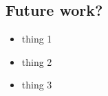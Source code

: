 \documentclass[a0,landscape]{a0poster}
\begin{document}
\begin{multicols}{3}





\section*{Future work?}
\begin{itemize}
	\item thing 1
	\item thing 2
	\item thing 3
\end{itemize}

\color{Gray}
\nocite{bader2017static,brenner2007mathematical}
 


%


\end{multicols}
\end{document}
